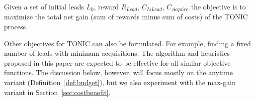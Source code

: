 \documentclass[prodmode,acmtecs]{acmsmall} %
\newcommand{\note}[2]{\textbf{\textsc{#1} says: \textit{#2}}}
\newcommand{\islead}[1]{{\em IsLead(#1)}}
\newcommand{\acquire}[1]{{\em Acquire(#1)}}
\begin{document}
\begin{definition}
Given a set of initial leads \(L_0\), reward \(R_{Lead}\), $C_{IsLead}$, $C_{Acquire}$ the objective is to maximize the total net gain (sum of rewards minus sum of costs) of the TONIC process.  
\label{def:gain}
\end{definition}



Other objectives for TONIC can also be formulated.  For example, finding a fixed number of leads with minimum acquisitions. The algorithm and heuristics proposed in this paper are expected to be effective for all similar objective functions. 
The discussion below, however, will focus mostly on the anytime variant (Definition~\ref{def:budget}), but we also experiment with the max-gain variant in Section~\ref{sec:costbenefit}.  

\end{document}

